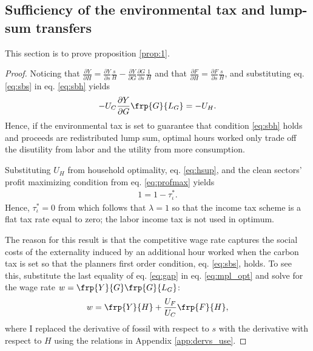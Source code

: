 \subsection{Sufficiency of the environmental tax and lump-sum transfers}\label{app:incometax0}
This section is to prove proposition \ref{prop:1}.

\begin{proof}
Noticing that $\frac{\partial Y}{\partial H}= \frac{\partial Y}{\partial s}\frac{s}{H}-\frac{\partial Y}{\partial G}\frac{\partial G}{\partial s}\frac{1}{H}$ and that $\frac{\partial F}{\partial H}=\frac{\partial F}{\partial s}\frac{s}{H}$, and substituting eq. \eqref{eq:sbs} in eq. \eqref{eq:sbh} yields
\begin{align}\label{eq:pigou}
-U_C \frac{\partial Y}{\partial G}\frp{G}{L_G}=-U_H.
\end{align}
Hence, if the environmental tax is set to guarantee that condition \eqref{eq:sbh} holds and proceeds are redistributed lump sum, optimal hours worked only trade off the disutility from labor and the utility from more consumption. 

Substituting $U_H$ from household optimality, eq. \eqref{eq:hsup}, and the clean sectors' profit maximizing condition from eq. \eqref{eq:profmax} yields
\begin{align}
1=1-\tau^*_\iota.\nonumber
\end{align}
Hence, $\tau^*_\iota =0$ from which follows that $\lambda =1$ so that the income tax scheme is a flat tax rate equal to zero; the labor income tax is not used in optimum.


The reason for this result is that the competitive wage rate captures the social costs of the externality induced by an additional hour worked when the carbon tax is set so that the planners first order condition, eq. \eqref{eq:sbs}, holds. 
To see this, substitute the last equality of eq. \eqref{eq:gap}
in eq. \eqref{eq:mpl_opt} and solve for the wage rate $w= \frp{Y}{G}\frp{G}{L_G}$:
\begin{align}
w= \frp{Y}{H}+\frac{U_F}{U_C}\frp{F}{H},
\end{align}
where I replaced the derivative of fossil with respect to $s$ with the derivative with respect to $H$ using the relations in Appendix \ref{app:dervs_use}. 

\end{proof}
%
